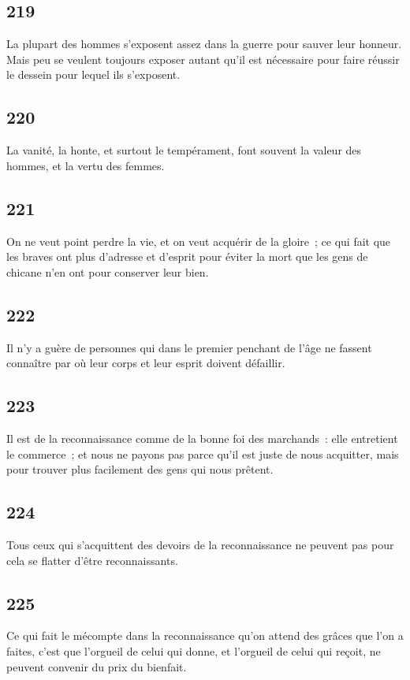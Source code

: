 \documentclass[french,twoside]{book} %
\begin{document}
\subsection[{219}]{ \textsc{219} }
\noindent La plupart des hommes s’exposent assez dans la guerre pour sauver leur honneur. Mais peu se veulent toujours exposer autant qu’il est nécessaire pour faire réussir le dessein pour lequel ils s’exposent.
\subsection[{220}]{ \textsc{220} }
\noindent La vanité, la honte, et surtout le tempérament, font souvent la valeur des hommes, et la vertu des femmes.
\subsection[{221}]{ \textsc{221} }
\noindent On ne veut point perdre la vie, et on veut acquérir de la gloire ; ce qui fait que les braves ont plus d’adresse et d’esprit pour éviter la mort que les gens de chicane n’en ont pour conserver leur bien.
\subsection[{222}]{ \textsc{222} }
\noindent Il n’y a guère de personnes qui dans le premier penchant de l’âge ne fassent connaître par où leur corps et leur esprit doivent défaillir.
\subsection[{223}]{ \textsc{223} }
\noindent Il est de la reconnaissance comme de la bonne foi des marchands : elle entretient le commerce ; et nous ne payons pas parce qu’il est juste de nous acquitter, mais pour trouver plus facilement des gens qui nous prêtent.
\subsection[{224}]{ \textsc{224} }
\noindent Tous ceux qui s’acquittent des devoirs de la reconnaissance ne peuvent pas pour cela se flatter d’être reconnaissants.
\subsection[{225}]{ \textsc{225} }
\noindent Ce qui fait le mécompte dans la reconnaissance qu’on attend des grâces que l’on a faites, c’est que l’orgueil de celui qui donne, et l’orgueil de celui qui reçoit, ne peuvent convenir du prix du bienfait.
\end{document}
